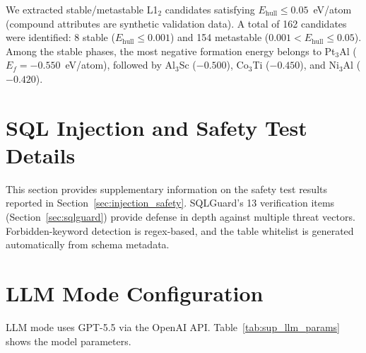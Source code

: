 \label{sec:sup_stable_l12}

We extracted stable/metastable L1$_2$ candidates satisfying $E_\text{hull} \leq 0.05$~eV/atom (compound attributes are synthetic validation data). A total of 162 candidates were identified: 8 stable ($E_\text{hull} \leq 0.001$) and 154 metastable ($0.001 < E_\text{hull} \leq 0.05$). Among the stable phases, the most negative formation energy belongs to Pt$_3$Al ($E_f = -0.550$~eV/atom), followed by Al$_3$Sc ($-0.500$), Co$_3$Ti ($-0.450$), and Ni$_3$Al ($-0.420$).


\section{SQL Injection and Safety Test Details}

\label{sec:sup_injection}

This section provides supplementary information on the safety test results reported in Section~\ref{sec:injection_safety}. SQLGuard's 13 verification items (Section~\ref{sec:sqlguard}) provide defense in depth against multiple threat vectors. Forbidden-keyword detection is regex-based, and the table whitelist is generated automatically from schema metadata.


\section{LLM Mode Configuration}
\label{sec:sup_llm_config}

LLM mode uses GPT-5.5 via the OpenAI API. Table~\ref{tab:sup_llm_params} shows the model parameters.

